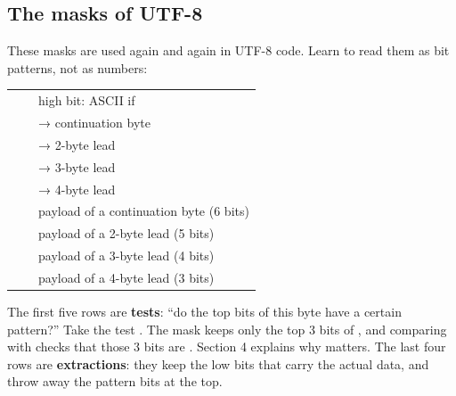 \documentclass[10pt,a4paper]{article}
\begin{document}
\subsection{The masks of UTF-8}
These masks are used again and again in UTF-8 code. Learn to read them as bit patterns, not as numbers:
\begin{datatable}{}{\small}
\begin{xltabular}{\linewidth}{@{}Y{0.43}Y{0.52}Y{2.05}@{}}
 &  &  \\ \hline
\endhead
{} &  & high bit: ASCII if  \\
 &  &  → continuation byte \\
 &  &  → 2-byte lead \\
 &  &  → 3-byte lead \\
 &  &  → 4-byte lead \\
 &  & payload of a continuation byte (6 bits) \\
 &  & payload of a 2-byte lead (5 bits) \\
 &  & payload of a 3-byte lead (4 bits) \\
 &  & payload of a 4-byte lead (3 bits) \\
\hline
\end{xltabular}
\end{datatable}
The first five rows are \textbf{tests}: “do the top bits of this byte have a certain pattern?” Take the test . The mask  keeps only the top 3 bits of , and comparing with  checks that those 3 bits are . Section 4 explains why  matters.
The last four rows are \textbf{extractions}: they keep the low bits that carry the actual data, and throw away the pattern bits at the top.
\end{document}
